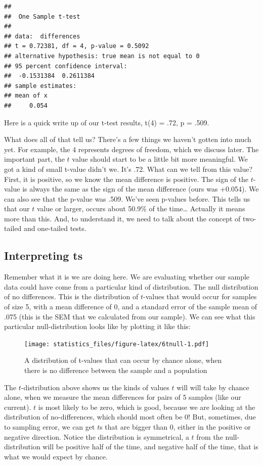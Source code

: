 \documentclass[]{book}
\begin{document}
\begin{verbatim}
## 
## 	One Sample t-test
## 
## data:  differences
## t = 0.72381, df = 4, p-value = 0.5092
## alternative hypothesis: true mean is not equal to 0
## 95 percent confidence interval:
##  -0.1531384  0.2611384
## sample estimates:
## mean of x 
##     0.054
\end{verbatim}

Here is a quick write up of our t-test results, t(4) = .72, p = .509.

What does all of that tell us? There's a few things we haven't gotten into much yet. For example, the 4 represents degrees of freedom, which we discuss later. The important part, the \(t\) value should start to be a little bit more meaningful. We got a kind of small t-value didn't we. It's .72. What can we tell from this value? First, it is positive, so we know the mean difference is positive. The sign of the \(t\)-value is always the same as the sign of the mean difference (ours was +0.054). We can also see that the p-value was .509. We've seen p-values before. This tells us that our \(t\) value or larger, occurs about 50.9\% of the time\ldots{} Actually it means more than this. And, to understand it, we need to talk about the concept of two-tailed and one-tailed tests.

\hypertarget{interpreting-ts}{%
\subsection{Interpreting ts}\label{interpreting-ts}}

Remember what it is we are doing here. We are evaluating whether our sample data could have come from a particular kind of distribution. The null distribution of no differences. This is the distribution of \(t\)-values that would occur for samples of size 5, with a mean difference of 0, and a standard error of the sample mean of .075 (this is the SEM that we calculated from our sample). We can see what this particular null-distribution looks like by plotting it like this:

\begin{figure}
\centering
\texttt{[image: statistics\_files/figure-latex/6tnull-1.pdf]}
\caption{\label{fig:6tnull}A distribution of t-values that can occur by chance alone, when there is no difference between the sample and a population}
\end{figure}

The \(t\)-distribution above shows us the kinds of values \(t\) will will take by chance alone, when we measure the mean differences for pairs of 5 samples (like our current). \(t\) is most likely to be zero, which is good, because we are looking at the distribution of no-differences, which should most often be 0! But, sometimes, due to sampling error, we can get \(t\)s that are bigger than 0, either in the positive or negative direction. Notice the distribution is symmetrical, a \(t\) from the null-distribution will be positive half of the time, and negative half of the time, that is what we would expect by chance.
\end{document}
